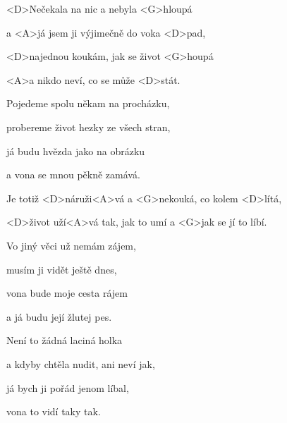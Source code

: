 

\zs
<D>Nečekala na nic a nebyla <G>hloupá

a <A>já jsem ji výjimečně do voka <D>pad,

<D>najednou koukám, jak se život <G>houpá

<A>a nikdo neví, co se může <D>stát.
\ks

\zs
Pojedeme spolu někam na procházku,

probereme život hezky ze všech stran,

já budu hvězda jako na obrázku

a vona se mnou pěkně zamává.
\ks

\zr
{Je} totiž <D>náruži<A>vá a <G>nekouká, co kolem <D>lítá,

<D>život uží<A>vá tak, jak to umí a <G>jak se jí to líbí.
\kr

\zs
Vo jiný věci už nemám zájem,

musím ji vidět ještě dnes,

vona bude moje cesta rájem

a já budu její žlutej pes.
\ks

\zs
Není to žádná laciná holka

a kdyby chtěla nudit, ani neví jak,

já bych ji pořád jenom líbal,

vona to vidí taky tak.
\ks

\zr \kr \zr \kr

\kp





